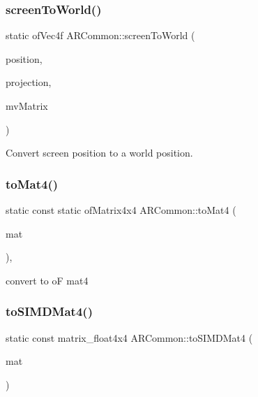 \subsubsection{\texorpdfstring{screen\+To\+World()}{screenToWorld()}}
{\footnotesize\ttfamily static of\+Vec4f A\+R\+Common\+::screen\+To\+World (\begin{DoxyParamCaption}\item[{of\+Vec3f}]{position,  }\item[{of\+Matrix4x4}]{projection,  }\item[{of\+Matrix4x4}]{mv\+Matrix }\end{DoxyParamCaption})\hspace{0.3cm}{\ttfamily [static]}}



Convert screen position to a world position. 

\mbox{\label{namespace_a_r_common_a7ea27fb9de7e7890d46de5bea9b535e6}} 
\subsubsection{\texorpdfstring{to\+Mat4()}{toMat4()}}
{\footnotesize\ttfamily static const static of\+Matrix4x4 A\+R\+Common\+::to\+Mat4 (\begin{DoxyParamCaption}\item[{const matrix\+\_\+float4x4 \&}]{mat }\end{DoxyParamCaption})\hspace{0.3cm}{\ttfamily [inline]}, {\ttfamily [static]}}



convert to oF mat4 

\mbox{\label{namespace_a_r_common_a94f59f549eb5aec3f077b54ae5e5df86}} 
\subsubsection{\texorpdfstring{to\+S\+I\+M\+D\+Mat4()}{toSIMDMat4()}}
{\footnotesize\ttfamily static const matrix\+\_\+float4x4 A\+R\+Common\+::to\+S\+I\+M\+D\+Mat4 (\begin{DoxyParamCaption}\item[{of\+Matrix4x4 \&}]{mat }\end{DoxyParamCaption})\hspace{0.3cm}{\ttfamily [static]}}



